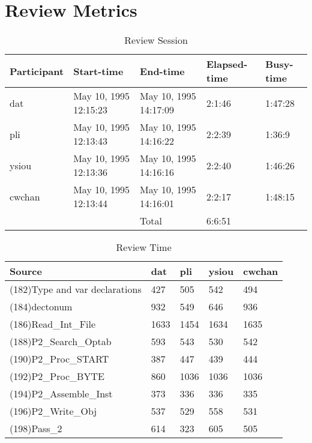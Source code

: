 \section{Review Metrics}
\begin{table}[hb]
\begin{center}
\begin{tabular}{|l|l|l|l|l|}
\hline
Participant & Start-time & End-time & Elapsed-time & Busy-time \\
\hline
dat & May 10, 1995 12:15:23 & May 10, 1995 14:17:09 & 2:1:46 & 1:47:28 \\
pli & May 10, 1995 12:13:43 & May 10, 1995 14:16:22 & 2:2:39 & 1:36:9 \\
ysiou & May 10, 1995 12:13:36 & May 10, 1995 14:16:16 & 2:2:40 & 1:46:26 \\
cwchan & May 10, 1995 12:13:44 & May 10, 1995 14:16:01 & 2:2:17 & 1:48:15 \\
\hline
 & & Total & 6:6:51 & \\
\hline
\end{tabular}
\end{center}
\caption{Review Session}
\end{table}


\begin{table}[hb]
\begin{center}
\begin{tabular}{|l|l|l|l|l|}
\hline
Source & dat & pli & ysiou & cwchan\\
\hline
(182)Type and var declarations & 427 & 505 & 542 & 494\\
(184)dectonum & 932 & 549 & 646 & 936\\
(186)Read\_Int\_File & 1633 & 1454 & 1634 & 1635\\
(188)P2\_Search\_Optab & 593 & 543 & 530 & 542\\
(190)P2\_Proc\_START & 387 & 447 & 439 & 444\\
(192)P2\_Proc\_BYTE & 860 & 1036 & 1036 & 1036\\
(194)P2\_Assemble\_Inst & 373 & 336 & 336 & 335\\
(196)P2\_Write\_Obj & 537 & 529 & 558 & 531\\
(198)Pass\_2 & 614 & 323 & 605 & 505\\
\hline
\end{tabular}
\end{center}
\caption{Review Time}
\end{table}

